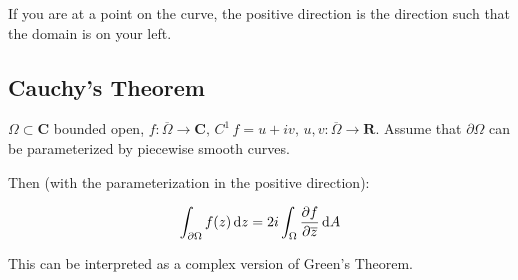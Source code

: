 
    





















If you are at a point on the curve, the positive direction is the direction such that the domain is on your left.

\subsection{Cauchy's Theorem}


\begin{proposition}
$\Omega \subset \mathbf{C}$ bounded open, $f:\overline{\Omega} \rightarrow \mathbf{C}, \, C^1 \, f = u+iv, \, u,v:\overline{\Omega} \rightarrow \mathbf{R}$. Assume that $\partial \Omega$ can be parameterized by piecewise smooth curves.

Then (with the parameterization in the positive direction):

\begin{align*}
    \int_{\partial \Omega} f(z)  \dif z = 2i \int_\Omega \frac{\partial f}{ \partial \overline{z}}  \dif A 
\end{align*}

This can be interpreted as a complex version of Green's Theorem.
\end{proposition}

